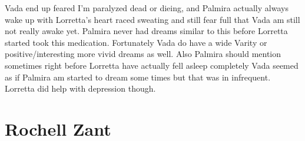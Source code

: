 \documentclass[12pt]{book}
\begin{document}
Vada end up feared I'm paralyzed dead or dieing, and Palmira actually always wake up with Lorretta's heart raced sweating and still fear full that Vada am still not really awake yet. Palmira never had dreams similar to this before Lorretta started took this medication. Fortunately Vada do have a wide Varity or positive/interesting more vivid dreams as well. Also Palmira should mention sometimes right before Lorretta have actually fell asleep completely Vada seemed as if Palmira am started to dream some times but that was in infrequent. Lorretta did help with depression though.



\chapter{Rochell Zant}
\end{document}
